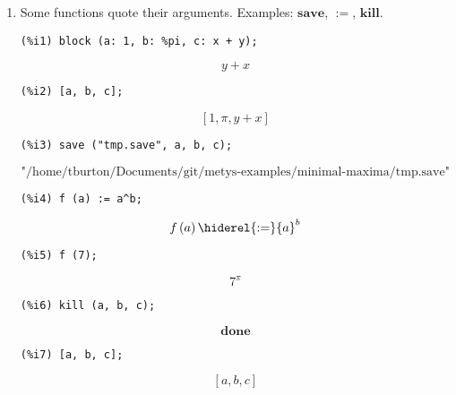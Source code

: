 \documentclass[12pt,leqno]{article}
\begin{document}
\begin{enumerate}
\item Some functions quote their arguments.
Examples: $\mathbf{save}$, $\mathbf{:=}$, $\mathbf{kill}$.
\begin{verbatim}
(%i1) block (a: 1, b: %pi, c: x + y);
\end{verbatim}
\begin{dmath}[number={\(\mathop{\mathrm{\%o}_{1}}\)}]
y+x
\end{dmath}
\begin{verbatim}
(%i2) [a, b, c];
\end{verbatim}
\begin{dmath}[number={\(\mathop{\mathrm{\%o}_{2}}\)}]
\left[1, \pi, y+x\right]
\end{dmath}
\begin{verbatim}
(%i3) save ("tmp.save", a, b, c);
\end{verbatim}
\begin{dmath}[number={\(\mathop{\mathrm{\%o}_{3}}\)}]
\text{"/home/tburton/Documents/git/metys-examples/minimal-maxima/tmp.save"}
\end{dmath}
\begin{verbatim}
(%i4) f (a) := a^b;
\end{verbatim}
\begin{dmath}[number={\(\mathop{\mathrm{\%o}_{4}}\)}]
f\left(a\right) \hiderel{:=} {a}^{b}
\end{dmath}
\begin{verbatim}
(%i5) f (7);
\end{verbatim}
\begin{dmath}[number={\(\mathop{\mathrm{\%o}_{5}}\)}]
{7}^{\pi}
\end{dmath}
\begin{verbatim}
(%i6) kill (a, b, c);
\end{verbatim}
\begin{dmath}[number={\(\mathop{\mathrm{\%o}_{6}}\)}]
\mathop{\mathbf{done}}
\end{dmath}
\begin{verbatim}
(%i7) [a, b, c];
\end{verbatim}
\begin{dmath}[number={\(\mathop{\mathrm{\%o}_{7}}\)}]
\left[a, b, c\right]
\end{dmath}



\end{enumerate}
\end{document}
